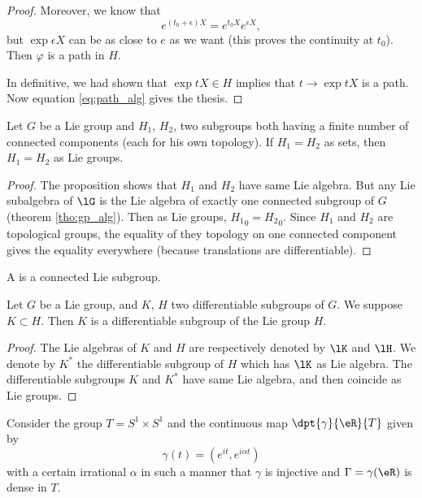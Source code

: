 \begin{proof}
Moreover, we know that 
\[
  e^{(t_0+\epsilon)X}=e^{t_0X}e^{\epsilon X},
\]
but $\exp \epsilon X$ can be as close to $e$ as we want (this proves the continuity at $t_0$). Then $\varphi$ is a path in $H$. 

In definitive, we had shown that $\exp tX\in H$ implies that $t\to\exp tX$ is a path. Now equation \eqref{eq:path_alg} gives the thesis.

\end{proof}

\begin{corollary}
Let $G$ be a Lie group and $H_1$, $H_2$, two subgroups both having a finite number of connected components (each for his own topology). If $H_1=H_2$ as sets, then $H_1=H_2$ as Lie groups.
\end{corollary}

\begin{proof}
The proposition shows that $H_1$ and $H_2$ have same Lie algebra. But any Lie subalgebra of $\lG$ is the Lie algebra of exactly one connected subgroup of $G$ (theorem \ref{tho:gp_alg}). Then as Lie groups, ${H_1}_0={H_2}_0$. Since $H_1$ and $H_2$ are topological groups, the equality of they topology on one connected component gives the equality everywhere (because translations are differentiable).
\end{proof}

\begin{definition}
A  is a connected Lie subgroup.
\end{definition}

\begin{corollary}
Let $G$ be a Lie group, and $K$, $H$ two differentiable subgroups of $G$. We suppose $K\subset H$. Then $K$ is a differentiable subgroup of the Lie group $H$.
\end{corollary}

\begin{proof}
The Lie algebras of $K$ and $H$ are respectively denoted by $\lK$ and $\lH$. We denote by $K^*$ the differentiable subgroup of $H$ which has $\lK$ as Lie algebra. The differentiable subgroups $K$ and $K^*$ have same Lie algebra, and then coincide as Lie groups.
\end{proof}

\label{pg:ex_topo_Lie}
Consider the group $T=S^1\times S^1$ and the continuous map $\dpt{\gamma}{\eR}{T}$ given by
\[
  \gamma(t)=(e^{it},e^{i\alpha t})
\]
with a certain irrational $\alpha$ in such a manner that $\gamma$ is injective and $\Gamma=\gamma(\eR)$ is dense in $T$.


